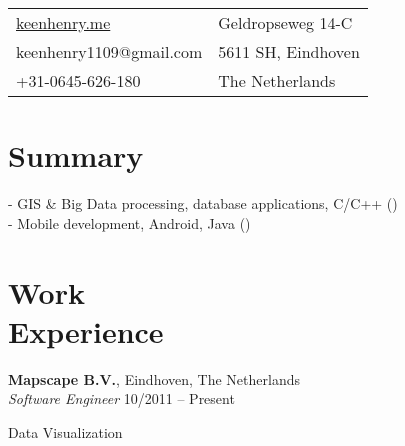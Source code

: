\documentclass[margin,line]{resume}
\begin{document}
\begin{resume}

      \begin{tabular}{@{}p{6cm}p{8.5cm}}
      \url{keenhenry.me}  &  Geldropseweg 14-C \\
      keenhenry1109@gmail.com             &  5611 SH, Eindhoven \\
      +31-0645-626-180	& The Netherlands \\
      \end{tabular}

 
    \section{\mysidestyle Summary}
      - GIS \& Big Data processing, database applications, C/C++ () \\
      - Mobile development, Android, Java () \\
      
    \section{\mysidestyle Work \\ Experience}

    \textbf{Mapscape B.V.}, Eindhoven, The Netherlands \\
    \textsl{Software Engineer} \hfill 10/2011 -- Present \vspace{-3mm}\\\vspace{-1mm}%
      \begin{list2}
      \item Data Visualization  %
      \end{list2}


\end{resume}
\end{document}
